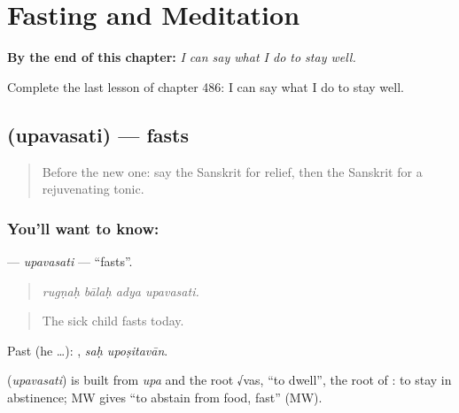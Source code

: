 
\chapter{Fasting and Meditation}
\label{ch:sa-fasting-and-meditation}

\begin{chapteropening}
\textbf{By the end of this chapter:} \emph{I can say what I do to stay well.}

Complete the last lesson of chapter 486: I can say what I do to stay well.
\end{chapteropening}

\section[\texorpdfstring{\sk{उपवसति} (upavasati)}{उपवसति (upavasati)}]{ (upavasati) — fasts}

\label{lesson:SA-C486-upavasati}



\begin{quote}
Before the new one: say the Sanskrit for relief, then the Sanskrit for a rejuvenating tonic.
\end{quote}

\subsection*{You'll want to know: }
\textbf{} — \emph{upavasati} — \textquotedblleft{}fasts\textquotedblright{}.

\begin{quote}
   
\end{quote}

\begin{quote}
\emph{rugṇaḥ bālaḥ adya upavasati.}
\end{quote}

\begin{quote}
The sick child fasts today.
\end{quote}

Past (he …):  , \emph{saḥ upoṣitavān}.

\begin{cousinweb}
\textbf{} (\emph{upavasati}) is built from \emph{upa} and the root √vas, \textquotedblleft{}to dwell\textquotedblright{}, the root of \textbf{}: to stay in abstinence; MW gives \textquotedblleft{}to abstain from food, fast\textquotedblright{} (MW).
\end{cousinweb}

